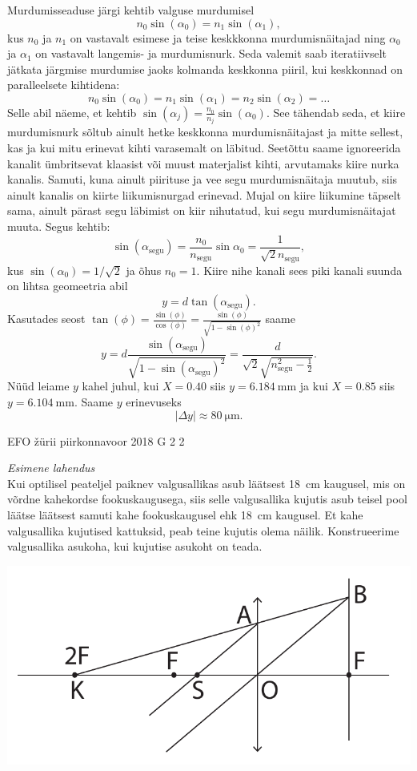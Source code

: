 \documentclass[11pt, twoside]{article}
\begin{document}
{{\ifSolution
Murdumisseaduse järgi kehtib valguse murdumisel
$$n_0\sin(\alpha_0)=n_1\sin(\alpha_1),$$
kus $n_0$ ja $n_1$ on vastavalt esimese ja teise keskkkonna murdumisnäitajad ning $\alpha_0$ ja $\alpha_1$ on vastavalt langemis- ja murdumisnurk. Seda valemit saab iteratiivselt jätkata järgmise murdumise jaoks kolmanda keskkonna piiril, kui keskkonnad on paralleelsete kihtidena:
$$n_0\sin(\alpha_0)=n_1\sin(\alpha_1)=n_2\sin(\alpha_2) = \dots$$
Selle abil näeme, et kehtib $\sin(\alpha_j)=\frac{n_0}{n_j}\sin(\alpha_0)$. See tähendab seda, et kiire murdumisnurk sõltub ainult hetke keskkonna murdumisnäitajast ja mitte sellest, kas ja kui mitu erinevat kihti varasemalt on läbitud. Seetõttu saame ignoreerida kanalit ümbritsevat klaasist või muust materjalist kihti, arvutamaks kiire nurka kanalis. Samuti, kuna ainult piirituse ja vee segu murdumisnäitaja muutub, siis ainult kanalis on kiirte liikumisnurgad erinevad. Mujal on kiire liikumine täpselt sama, ainult pärast segu läbimist on kiir nihutatud, kui segu murdumisnäitajat muuta. Segus kehtib:
$$\sin(\alpha_{\text{segu}})=\frac{n_0}{n_{\text{segu}}}\sin{\alpha_0} = \frac{1}{\sqrt{2}n_{\text{segu}}},$$
kus $\sin(\alpha_0) = 1/\sqrt{2}$ ja õhus $n_0=1$. Kiire nihe kanali sees piki kanali suunda on lihtsa geomeetria abil $$y=d\tan(\alpha_{\text{segu}}).$$
Kasutades seost $\tan(\phi) = \frac{\sin(\phi)}{\cos(\phi)} = \frac{\sin(\phi)}{\sqrt{1-\sin(\phi)^2}}$ saame
$$y = d \frac{\sin(\alpha_{\text{segu}})}{\sqrt{1-\sin(\alpha_{\text{segu}})^2}} = \frac{d}{\sqrt{2}\sqrt{n_{\text{segu}}^2-\frac12}}.$$
Nüüd leiame $y$ kahel juhul, kui $X=\num{0.40}$ siis $y=\SI{6.184}{\milli\meter}$ ja kui $X=\num{0.85}$ siis $y=\SI{6.104}{\milli\meter}$. Saame $y$ erinevuseks
$$|\Delta y| \approx \SI{80}{\micro\meter}.$$
\fi
}

{EFO žürii} %
{piirkonnavoor} %
{2018} %
{G 2} %
{2} %
{

\ifSolution
\emph{Esimene lahendus}\\
Kui optilisel peateljel paiknev valgusallikas asub läätsest \SI{18}{cm} kaugusel, mis on võrdne kahekordse fookuskaugusega, siis selle valgusallika kujutis asub teisel pool läätse läätsest samuti kahe fookuskaugusel ehk \SI{18}{cm} kaugusel. Et kahe valgusallika kujutised kattuksid, peab teine kujutis olema näilik.
Konstrueerime valgusallika asukoha, kui kujutise asukoht on teada. 
 \vspace{-10pt}
 \begin{center}
 \includegraphics[width=0.7\linewidth]{2018-v2g-02-valgusallikaslah}
 \end{center}
 \vspace{-10pt}

}}
\end{document}
